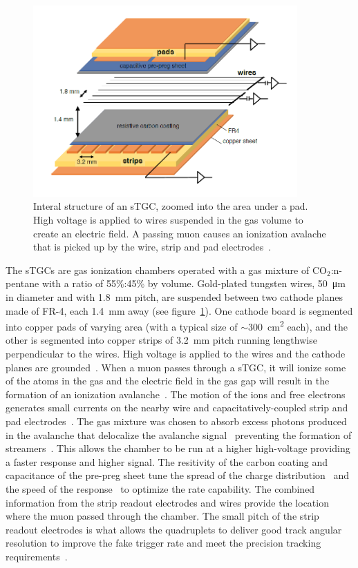 \begin{figure}
    \centering
    \includegraphics[width = 0.9\textwidth]{figures/stgc_internals.png}
    \caption{Interal structure of an sTGC, zoomed into the area under a pad. High voltage is applied to wires suspended in the gas volume to create an electric field. A passing muon causes an ionization avalache that is picked up by the wire, strip and pad electrodes~\cite{lefebvre_precision_2020}.}
    \label{fig:stgc_internals}
\end{figure}

The sTGCs are gas ionization chambers operated with a gas mixture of CO$_2$:n-pentane with a ratio of 55\%:45\% by volume. Gold-plated tungsten wires, \SI{50}{\micro\meter} in diameter and with \SI{1.8}{mm} pitch, are suspended between two cathode planes made of FR-4, each \SI{1.4}{mm} away (see figure~\ref{fig:stgc_internals}). One cathode board is segmented into copper pads of varying area (with a typical size of $\sim$\SI{300}{cm^2} each), and the other is segmented into copper strips of \SI{3.2}{mm} pitch running lengthwise perpendicular to the wires. High voltage is applied to the wires and the cathode planes are grounded~\cite{nsw_tdr, perez-codina_small-strip_2016}. When a muon passes through a sTGC, it will ionize some of the atoms in the gas and the electric field in the gas gap will result in the formation of an ionization avalanche~\cite{townsend_electricity_1915}. The motion of the ions and free electrons generates small currents on the nearby wire and capacitatively-coupled strip and pad electrodes~\cite{nsw_tdr}. The gas mixture was chosen to absorb excess photons produced in the avalanche that delocalize the avalanche signal~\cite{majewski_thin_1983} preventing the formation of streamers~\cite{grupen_particle_2008}.  This allows the chamber to be run at a higher high-voltage providing a faster response and higher signal. The resitivity of the carbon coating and capacitance of the pre-preg sheet tune the spread of the charge distribution~\cite{gatti_optimum_1979} and the speed of the response~\cite{battistoni_resistive_1982} to optimize the rate capability. The combined information from the strip readout electrodes and wires provide the location where the muon passed through the chamber. The small pitch of the strip readout electrodes is what allows the quadruplets to deliver good track angular resolution to improve the fake trigger rate and meet the precision tracking requirements~\cite{nsw_tdr}.

